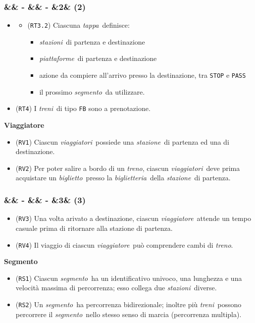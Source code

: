 \documentclass[slidestop,compress,blackandwhite]{beamer}
\newcommand{\ttt}[1]{\texttt{#1}}
\newcommand{\ii}[1]{\textit{#1}}
\newcommand{\treno}{\ii{treno}}
\newcommand{\treni}{\ii{treni}}
\newcommand{\viaggiatore}{\ii{viaggiatore}}
\newcommand{\viaggiatori}{\ii{viaggiatori}}
\newcommand{\stazione}{\ii{stazione}}
\newcommand{\stazioni}{\ii{stazioni}}
\newcommand{\piattaforme}{\ii{piattaforme}}
\newcommand{\ticket}{\ii{biglietto}}
\newcommand{\segmento}{\ii{segmento}}
\newcommand{\stage}{\ii{tappa}}
\newcommand{\biglietteria}{\ii{biglietteria}}
\newcommand{\newtitle}[4]{
	#1 
	\ifx&#2&%
	\else
  		\large- #2
	\fi
	\ifx&#3&%
	\else
  		\normalsize- #3
	\fi
	\ifx&#4&%
	\else
  		\normalsize (#4)
	\fi
}
\newcommand{\newframe}[5]{
	\begin{frame}
		\frametitle{\newtitle{#1}{#2}{#3}{#4}}
		#5
	\end{frame}
}
\newcommand{\itemt}[1]{\item (\ttt{#1})}
\begin{document}
	
	\newframe{}{}{}{2}{
	
		\begin{itemize}
			\item[]
			\begin{itemize} 
				\itemt{RT3.2} Ciascuna \stage~definisce:
				\begin{itemize}
					\item \stazioni~di partenza e destinazione
					\item \piattaforme~di partenza e destinazione
					\item azione da compiere all'arrivo presso la destinazione, tra \ttt{STOP} e \ttt{PASS}
					\item il prossimo \segmento~da utilizzare.
				\end{itemize}
			\end{itemize}
			\itemt{RT4} I \treni~di tipo \ttt{FB} sono a prenotazione.
		\end{itemize}
		\vspace{0.5cm}
		\textbf{Viaggiatore}
		\begin{itemize}
			\itemt{RV1} Ciascun \viaggiatori~possiede una \stazione~di partenza ed una di destinazione.
			\itemt{RV2} Per poter salire a bordo di un \treno, ciascun \viaggiatori~deve prima acquistare un \ticket~presso la \biglietteria~della \stazione~di partenza.
		\end{itemize}
	}

	\newframe{}{}{}{3}{
		\begin{itemize}
			\itemt{RV3} Una volta arivato a destinazione, ciascun \viaggiatore~attende un tempo casuale prima di ritornare alla stazione di partenza.
			\itemt{RV4} Il viaggio di ciascun \viaggiatore~può comprendere cambi di \treno.
		\end{itemize}
		\vspace{0.5cm}
		\textbf{Segmento}
		\begin{itemize}
			\itemt{RS1} Ciascun \segmento~ha un identificativo univoco, una lunghezza e una velocità massima di percorrenza; esso collega due \stazioni~diverse.
			\itemt{RS2} Un \segmento~ha percorrenza bidirezionale; inoltre più \treni~possono percorrere il \segmento~nello stesso senso di marcia (percorrenza multipla).  
		\end{itemize}
	}
\end{document}
